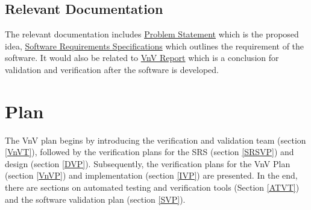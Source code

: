 \documentclass[12pt, titlepage]{article}
\begin{document}


\subsection{Relevant Documentation}
The relevant documentation includes \href{https://github.com/CynthiaLiu0805/BridgeCorrosion/blob/main/docs/ProblemStatementAndGoals/ProblemStatement.pdf}{Problem Statement} which is the proposed idea, \href{https://github.com/CynthiaLiu0805/BridgeCorrosion/blob/main/docs/SRS/SRS.pdf}{Software Requirements Specifications} which outlines the requirement of the software. It would also be related to \href{}{VnV Report} which is a conclusion for validation and verification after the software is developed.

 



\section{Plan}
The VnV plan begins by introducing the verification and validation team (section \ref{VnVT}), followed by the verification plans for the SRS (section \ref{SRSVP}) and design (section \ref{DVP}). Subsequently, the verification plans for the VnV Plan (section \ref{VnVP}) and implementation (section \ref{IVP}) are presented. In the end, there are sections on automated testing and verification tools (Section \ref{ATVT}) and the software validation plan (section \ref{SVP}).
\end{document}
